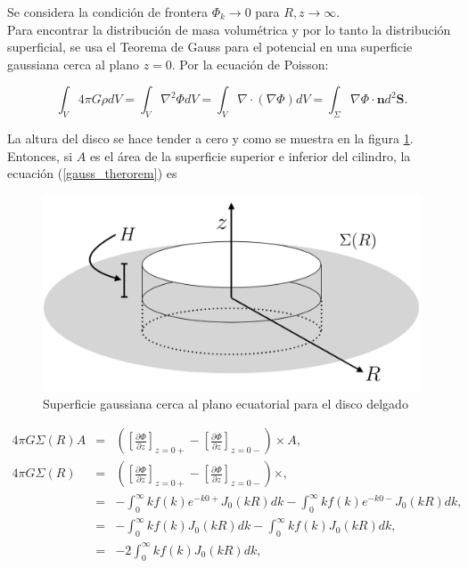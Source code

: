 \begin{appendix}
Se considera la condición de frontera $\Phi_k \rightarrow 0$ para $R,z \rightarrow \infty$.\\

Para encontrar la distribución de masa volumétrica y por lo tanto la distribución superficial, se usa el Teorema de Gauss para el potencial en una superficie gaussiana cerca al plano $z=0$. Por la ecuación de Poisson:

\begin{equation}
\label{gauss_therorem}
\int_V 4\pi G\rho dV = \int_V \nabla^2\Phi dV = \int_V \nabla \cdot ( \nabla \Phi)  dV = \int_{\Sigma} \nabla \Phi \cdot \textbf{n} d^2 \textbf{S}.
\end{equation}

La altura del disco se hace tender a cero y como se muestra en la figura \ref{fig:disk_surface}. Entonces, si $A$ es el área de la superficie superior e inferior del cilindro, la ecuación (\ref{gauss_therorem}) es

 \begin{figure}
\centering
\includegraphics[width=0.8\columnwidth]{Anexos/disk_surface.png}
\caption{Superficie gaussiana cerca al plano ecuatorial para el disco delgado }
\label{fig:disk_surface}
\end{figure}


\begin{eqnarray}
 4\pi G \Sigma(R) A &=& \left (  \left [ \frac{\partial \Phi}{ \partial z }   \right ]_{z=0+} - \left [ \frac{\partial \Phi}{ \partial z }   \right ]_{z=0-} \right ) \times A,  \\
 4\pi G \Sigma(R) &=& \left (  \left [ \frac{\partial \Phi}{ \partial z }   \right ]_{z=0+} - \left [ \frac{\partial \Phi}{ \partial z }   \right ]_{z=0-} \right ) \times, \\
    &=& -\int_0^{\infty} k f(k) e^{-k0+}J_0(kR) dk - \int_0^{\infty} kf(k) e^{-k0-} J_0(kR) dk, \\
    &=& -\int_0^{\infty} k f(k) J_0(kR) dk - \int_0^{\infty} kf(k)  J_0(kR) dk, \\
    &=& -2\int_0^{\infty} k f(k) J_0(kR) dk, \\
 \end{eqnarray}


\end{appendix}
